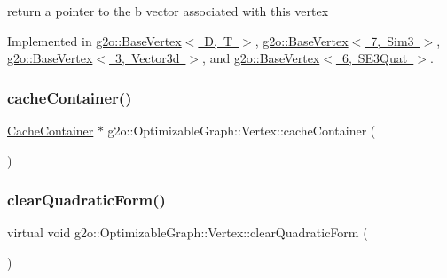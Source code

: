 return a pointer to the b vector associated with this vertex 



Implemented in \mbox{\hyperlink{classg2o_1_1_base_vertex_ac8edea7073e5850c90b0ba37092b8f84}{g2o\+::\+Base\+Vertex$<$ D, T $>$}}, \mbox{\hyperlink{classg2o_1_1_base_vertex_ac8edea7073e5850c90b0ba37092b8f84}{g2o\+::\+Base\+Vertex$<$ 7, Sim3 $>$}}, \mbox{\hyperlink{classg2o_1_1_base_vertex_ac8edea7073e5850c90b0ba37092b8f84}{g2o\+::\+Base\+Vertex$<$ 3, Vector3d $>$}}, and \mbox{\hyperlink{classg2o_1_1_base_vertex_ac8edea7073e5850c90b0ba37092b8f84}{g2o\+::\+Base\+Vertex$<$ 6, S\+E3\+Quat $>$}}.

\mbox{\label{classg2o_1_1_optimizable_graph_1_1_vertex_ab381120a2c00fc8ae90e5c298dfbb967}} 
\subsubsection{\texorpdfstring{cache\+Container()}{cacheContainer()}}
{\footnotesize\ttfamily \mbox{\hyperlink{classg2o_1_1_cache_container}{Cache\+Container}} $\ast$ g2o\+::\+Optimizable\+Graph\+::\+Vertex\+::cache\+Container (\begin{DoxyParamCaption}{ }\end{DoxyParamCaption})}

\mbox{\label{classg2o_1_1_optimizable_graph_1_1_vertex_a803897f6bae25dece4d7e23330f0f9da}} 
\subsubsection{\texorpdfstring{clear\+Quadratic\+Form()}{clearQuadraticForm()}}
{\footnotesize\ttfamily virtual void g2o\+::\+Optimizable\+Graph\+::\+Vertex\+::clear\+Quadratic\+Form (\begin{DoxyParamCaption}{ }\end{DoxyParamCaption})\hspace{0.3cm}{\ttfamily [pure virtual]}}

